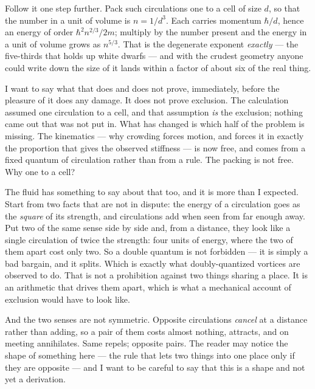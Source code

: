 Follow it one step further. Pack such circulations one to a cell of size $d$, so that the number in a unit of volume is $n = 1/d^{3}$. Each carries momentum $\hbar/d$, hence an energy of order $\hbar^{2}n^{2/3}/2m$; multiply by the number present and the energy in a unit of volume grows as $n^{5/3}$. That is the degenerate exponent \emph{exactly} --- the five-thirds that holds up white dwarfs --- and with the crudest geometry anyone could write down the size of it lands within a factor of about six of the real thing.

I want to say what that does and does not prove, immediately, before the pleasure of it does any damage. It does not prove exclusion. The calculation assumed one circulation to a cell, and that assumption \emph{is} the exclusion; nothing came out that was not put in. What has changed is which half of the problem is missing. The kinematics --- why crowding forces motion, and forces it in exactly the proportion that gives the observed stiffness --- is now free, and comes from a fixed quantum of circulation rather than from a rule. The packing is not free. Why one to a cell?

The fluid has something to say about that too, and it is more than I expected. Start from two facts that are not in dispute: the energy of a circulation goes as the \emph{square} of its strength, and circulations add when seen from far enough away. Put two of the same sense side by side and, from a distance, they look like a single circulation of twice the strength: four units of energy, where the two of them apart cost only two. So a double quantum is not forbidden --- it is simply a bad bargain, and it splits. Which is exactly what doubly-quantized vortices are observed to do. That is not a prohibition against two things sharing a place. It is an arithmetic that drives them apart, which is what a mechanical account of exclusion would have to look like.

And the two senses are not symmetric. Opposite circulations \emph{cancel} at a distance rather than adding, so a pair of them costs almost nothing, attracts, and on meeting annihilates. Same repels; opposite pairs. The reader may notice the shape of something here --- the rule that lets two things into one place only if they are opposite --- and I want to be careful to say that this is a shape and not yet a derivation.

